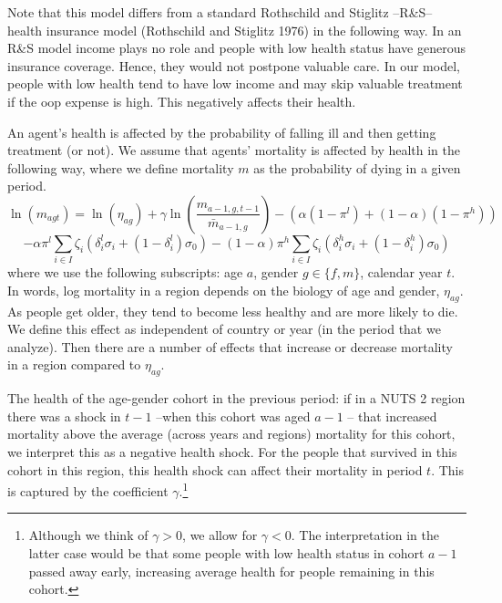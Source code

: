 \documentclass[a4paper,12pt]{article}
\makeatletter
\newcommand{\citeprocitem}[2]{\hyper@linkstart{cite}{citeproc_bib_item_#1}#2\hyper@linkend}
\makeatother
\begin{document}
Note that this model differs from a standard Rothschild and Stiglitz --R\&S-- health insurance model (\citeprocitem{23}{Rothschild and Stiglitz 1976}) in the following way. In an R\&S model income plays no role and people with low health status have generous insurance coverage. Hence, they would not postpone valuable care. In our model, people with low health tend to have low income and may skip valuable treatment if the oop expense is high. This negatively affects their health.

An agent's health is affected by the probability of falling ill and then getting treatment (or not). We assume that agents' mortality is affected by health in the following way, where we define mortality \(m\) as the probability of dying in a given period.
\begin{equation}
\label{eq:health}
\ln(m_{agt}) = \ln({\eta}_{ag}) + \gamma \ln \left( \frac{m_{a-1,g,t-1}}{\bar m_{a-1,g}}\right) - (\alpha (1-\pi^l) + (1-\alpha) (1-\pi^{h})) \end{equation}
\begin{equation*}
 - \alpha \pi^l \sum_{i \in I} \zeta_i (\delta_i^l \sigma_i + (1-\delta_i^l)\sigma_0) - (1-\alpha) \pi^h \sum_{i \in I} \zeta_i (\delta_i^h \sigma_i + (1-\delta_i^h) \sigma_0)
\end{equation*}
where we use the following subscripts: age \(a\), gender \(g \in \{f,m\}\), calendar year \(t\). In words, log mortality in a region depends on the biology of age and gender, \(\eta_{ag}\). As people get older, they tend to become less healthy and are more likely to die. We define this effect as independent of country or year (in the period that we analyze). Then there are a number of effects that increase or decrease mortality in a region compared to \(\eta_{ag}\).

The health of the age-gender cohort in the previous period: if in a NUTS 2 region there was a shock in \(t-1\) --when this cohort was aged \(a-1\) -- that increased mortality above the average (across years and regions) mortality for this cohort, we interpret this as a negative health shock. For the people that survived in this cohort in this region, this health shock can affect their mortality in period \(t\). This is captured by the coefficient \(\gamma\).\footnote{Although we think of \(\gamma>0\), we allow for \(\gamma<0\). The interpretation in the latter case would be that some people with low health status in cohort \(a-1\) passed away early, increasing average health for people remaining in this cohort.}
\end{document}
